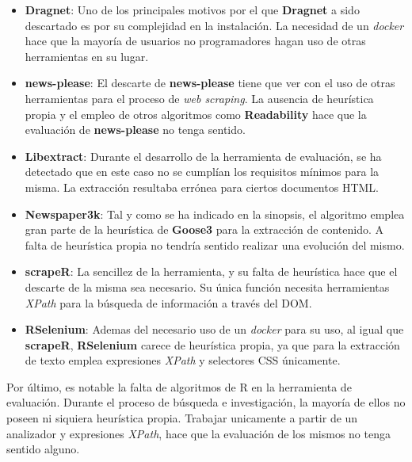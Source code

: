\begin{itemize}
  \item \textbf{Dragnet}: Uno de los principales motivos por el que \textbf{Dragnet} a sido descartado es 
  por su complejidad en la instalación. La necesidad de un \emph{docker} hace que la mayoría de usuarios 
  no programadores hagan uso de otras herramientas en su lugar.
  \item \textbf{news-please}: El descarte de \textbf{news-please} tiene que ver con el uso de otras
  herramientas para el proceso de \emph{web scraping}. La ausencia de heurística propia y el empleo de otros 
  algoritmos como \textbf{Readability} hace que la evaluación de \textbf{news-please} no tenga sentido.
  \item \textbf{Libextract}: Durante el desarrollo de la herramienta de evaluación, se ha detectado que en
  este caso no se cumplían los requisitos mínimos para la misma. La extracción resultaba errónea para
  ciertos documentos HTML.
  \item \textbf{Newspaper3k}: Tal y como se ha indicado en la sinopsis, el algoritmo emplea gran parte de
  la heurística de \textbf{Goose3} para la extracción de contenido. A falta de heurística propia no tendría
  sentido realizar una evolución del mismo.
  \item \textbf{scrapeR}: La sencillez de la herramienta, y su falta de heurística hace que el descarte 
  de la misma sea necesario. Su única función necesita herramientas \emph{XPath} para la búsqueda de 
  información a través del DOM.
  \item \textbf{RSelenium}: Ademas del necesario uso de un \emph{docker} para su uso, al igual que 
  \textbf{scrapeR}, \textbf{RSelenium} carece de heurística propia, ya que para la extracción de texto 
  emplea expresiones \emph{XPath} y selectores CSS únicamente.
\end{itemize}

Por último, es notable la falta de algoritmos de R en la herramienta de evaluación. Durante el proceso de
búsqueda e investigación, la mayoría de ellos no poseen ni siquiera heurística propia. Trabajar unicamente 
a partir de un analizador y expresiones \emph{XPath}, hace que la evaluación de los mismos no tenga sentido 
alguno.

